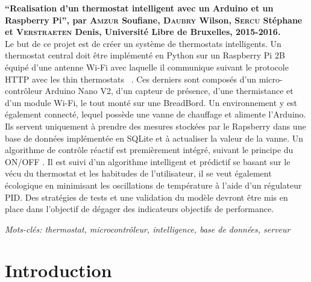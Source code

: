 \documentclass[11pt,a4paper,11pt]{report}
\let\pagebreakORIG\pagebreak
\let\clearpageORIG\clearpage
\let\cleardoublepageORIG\cleardoublepage
\newcommand{\removepagebreak}{\renewcommand{\pagebreak}{}\renewcommand{\clearpage}{}\renewcommand{\cleardoublepage}{}}
\newcommand{\restorepagebreak}{\renewcommand{\pagebreak}{\pagebreakORIG}\renewcommand{\clearpage}{\clearpageORIG}\renewcommand{\cleardoublepage}{\cleardoublepageORIG}}
\begin{document}
\textbf{“Realisation d'un thermostat intelligent avec un Arduino et un Raspberry Pi”,
par \textsc{Amzur} Soufiane, \textsc{Daubry} Wilson, \textsc{Sercu} Stéphane et \textsc{Verstraeten} Denis, Université Libre de Bruxelles, 2015-2016.}
\vspace{0.2cm}\\
Le but de ce projet est de créer un système de thermostats intelligents. Un thermostat central doit être implémenté en Python sur un Raspberry Pi 2B équipé d'une antenne Wi-Fi avec laquelle il communique suivant le protocole HTTP avec les \og thin thermostats \fg ~. Ces derniers sont composés d'un micro-contrôleur Arduino Nano V2, d'un capteur de présence, d'une thermistance et d'un module Wi-Fi, le tout monté sur une BreadBord. Un environnement y est également connecté, lequel possède une vanne de chauffage et alimente l'Arduino. Ils servent uniquement à prendre des mesures stockées par le Rapsberry dans une base de données implémentée en SQLite et à actualiser la valeur de la vanne. Un algorithme de contrôle réactif est premièrement intégré, suivant le principe du \og ON/OFF \fg. Il est suivi d'un algorithme intelligent et prédictif se basant sur le \og vécu \fg du thermostat et les habitudes de l'utilisateur, il se veut également écologique en minimisant les oscillations de température à l'aide d'un régulateur PID. Des stratégies de tests et une validation du modèle devront être mis en place dans l'objectif de dégager des indicateurs objectifs de performance.\newline

\textit{Mots-clés:  thermostat, microcontrôleur, intelligence, base de données, serveur}

\newpage


\renewcommand{\contentsname}{Table des matières}
\tableofcontents
\listoffigures  %
\removepagebreak
\listoftables 
\restorepagebreak

\renewcommand{\baselinestretch}{1.5}

\chapter{Introduction} %
\end{document}
